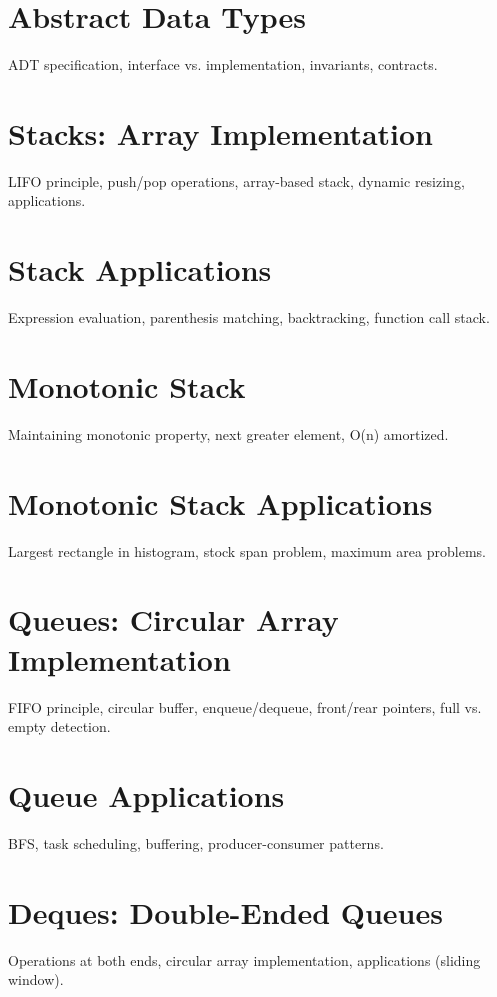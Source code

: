 
\chapter{Abstract Data Types}
ADT specification, interface vs. implementation, invariants, contracts.

\chapter{Stacks: Array Implementation}
LIFO principle, push/pop operations, array-based stack, dynamic resizing, applications.

\chapter{Stack Applications}
Expression evaluation, parenthesis matching, backtracking, function call stack.

\chapter{Monotonic Stack}
Maintaining monotonic property, next greater element, O(n) amortized.

\chapter{Monotonic Stack Applications}
Largest rectangle in histogram, stock span problem, maximum area problems.

\chapter{Queues: Circular Array Implementation}
FIFO principle, circular buffer, enqueue/dequeue, front/rear pointers, full vs. empty detection.

\chapter{Queue Applications}
BFS, task scheduling, buffering, producer-consumer patterns.

\chapter{Deques: Double-Ended Queues}
Operations at both ends, circular array implementation, applications (sliding window).

